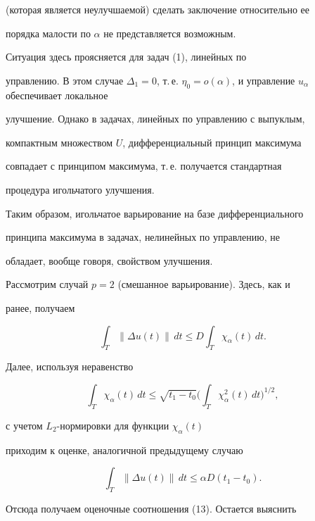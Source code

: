 (которая является неулучшаемой) сделать заключение относительно ее


порядка малости по $\alpha$ не представляется возможным.


Ситуация здесь проясняется для задач (1), линейных по


управлению. В этом случае $\Delta_{1} = 0$, т.\,е. $\eta_{0} =


o(\alpha)$, и управление $u_{\alpha}$ обеспечивает локальное


улучшение. Однако в задачах, линейных по управлению с выпуклым,


компактным множеством $U$, дифференциальный принцип максимума


совпадает с принципом максимума, т.\,е. получается стандартная


процедура игольчатого улучшения.





Таким образом, игольчатое варьирование на базе дифференциального


принципа максимума в задачах, нелинейных по управлению, не


обладает, вообще говоря, свойством улучшения.





Рассмотрим случай $p = 2$ (смешанное варьирование). Здесь, как и


ранее, получаем


$$


\int_{T} \| \Delta u(t)\|\,dt \leq D \int_{T} \chi_{\alpha}(t)\,dt.


$$


Далее, используя неравенство


$$


\int_{T} \chi_{\alpha}(t)\,dt \leq \sqrt{t_{1} - t_{0}}


\bigg( \int_{T} \chi_{\alpha}^{2}(t)\,dt\bigg)^{1/2},


$$


с учетом $L_{2}$-нормировки для функции $\chi_{\alpha}(t)$


приходим к оценке, аналогичной предыдущему случаю


\begin{equation}


\int_{T} \| \Delta u(t)\|\,dt \leq \alpha D (t_{1} - t_{0}).


\end{equation}


Отсюда получаем оценочные соотношения (13). Остается выяснить


